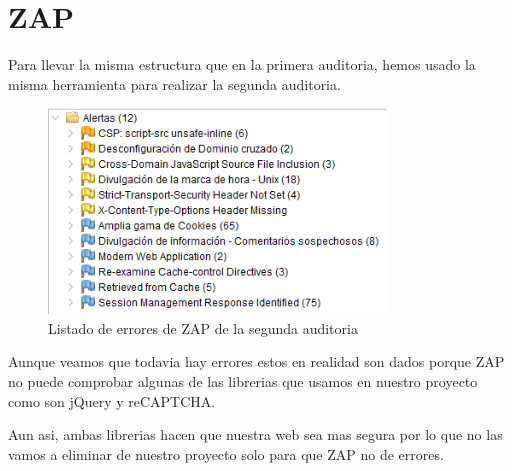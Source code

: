 \documentclass{report}
\begin{document}
        \section{ZAP}
            Para llevar la misma estructura que en la primera auditoria, hemos usado la misma herramienta para realizar la segunda auditoria.
            \begin{figure}[H]
                \centering
                \includegraphics[width=0.8\textwidth]{./img/audit2/zap1.png}
                \caption{Listado de errores de ZAP de la segunda auditoria}
            \end{figure}
            Aunque veamos que todavia hay errores estos en realidad son dados porque ZAP no puede comprobar algunas de las librerias que usamos en nuestro proyecto como son jQuery y reCAPTCHA.
            
            Aun asi, ambas librerias hacen que nuestra web sea mas segura por lo que no las vamos a eliminar de nuestro proyecto solo para que ZAP no de errores.
        \clearpage
\end{document}
